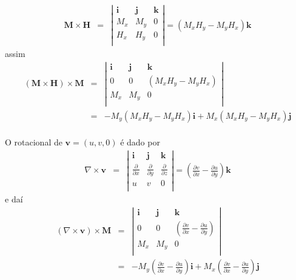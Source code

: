 \documentclass[eletromagnetismo.tex]{subfiles}
\begin{document}
\begin{eqnarray}
	\mathbf{M}\times \mathbf{H} & = & \left| \begin{array}{ccc}
 	\mathbf{i} & \mathbf{j} & \mathbf{k}\\
 	M_x & M_y & 0\\
 	H_x & H_y & 0\\
 \end{array}
 \right| = (M_x H_y - M_y H_x)\mathbf{k}
\end{eqnarray}
assim
\begin{eqnarray}
(\mathbf{M}\times \mathbf{H})\times \mathbf{M} & = & \left| \begin{array}{ccc}
 	\mathbf{i} & \mathbf{j} & \mathbf{k}\\
 	0 & 0 & (M_x H_y - M_y H_x)\\
 	M_x & M_y & 0\\
 \end{array}
 \right|\\ 
 &=& -M_y(M_x H_y - M_y H_x)\mathbf{i}+M_x(M_x H_y - M_y H_x)\mathbf{j}
\end{eqnarray}

\paragraph{} O rotacional de $\mathbf{v} = (u, v, 0)$ é dado por \begin{eqnarray}
	\nabla\times \mathbf{v} & = & \left|\begin{array}{ccc}
\mathbf{i} & \mathbf{j} & \mathbf{k}\\
\frac{\partial}{\partial x} & \frac{\partial}{\partial y} & \frac{\partial}{\partial z}\\
u & v & 0\\
\end{array}
\right| = \left(\frac{\partial v}{\partial x} - \frac{\partial u}{\partial y}\right)\mathbf{k}
\end{eqnarray} e daí \begin{eqnarray}
(\nabla\times \mathbf{v})\times \mathbf{M} & = & \left|\begin{array}{ccc}
\mathbf{i} & \mathbf{j} & \mathbf{k} \\
0 & 0 & 	\left(\frac{\partial v}{\partial x} - \frac{\partial u}{\partial y}\right)\\
M_x & M_y & 0\\
\end{array}
\right| \\
& =& -M_y\left(\frac{\partial v}{\partial x} - \frac{\partial u}{\partial y}\right)\mathbf{i} + M_x\left(\frac{\partial v}{\partial x} - \frac{\partial u}{\partial y}\right)\mathbf{j}
\end{eqnarray}
\end{document}

